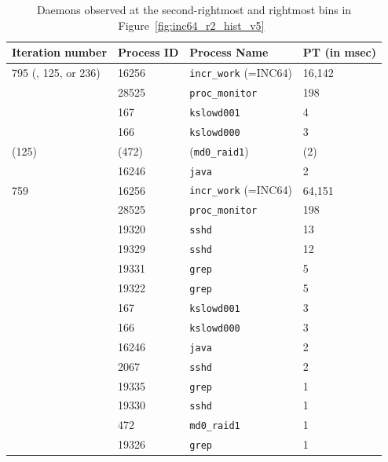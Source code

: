 \begin{table}[h]
\begin{center}
\begin{tabular}{|l|l|l|l|} \hline
Iteration number &  Process ID & Process Name  & PT (in msec)\\ \hline
795 (, 125, or 236) & 16256 & {\tt incr\_work} (=INC64) & 16,142 \\ \hline
	& 28525 & {\tt proc\_monitor} & 198 \\ \hline
	& 167 & {\tt kslowd001} &  4 \\ \hline
	& 166 & {\tt kslowd000} &  3 \\ \hline 
(125) & (472) & ({\tt md0\_raid1}) & (2) \\ \hline
    & 16246 & {\tt java} &  2 \\ \hline 
\hline 
759 & 16256 & {\tt incr\_work} (=INC64) & 64,151 \\ \hline
& 28525 & {\tt proc\_monitor} & 198 \\ \hline
& 19320 & {\tt sshd} & 13 \\ \hline
& 19329 & {\tt sshd}  & 12 \\ \hline
& 19331 & {\tt grep}  &  5 \\ \hline
& 19322 & {\tt grep}  &  5 \\ \hline
& 167 & {\tt kslowd001} & 3\\ \hline
& 166 & {\tt kslowd000} &  3 \\ \hline
& 16246 & {\tt java} &  2 \\ \hline
& 2067 & {\tt sshd}  &  2 \\ \hline
& 19335 & {\tt grep}  &  1 \\ \hline
& 19330 & {\tt sshd}  &  1 \\ \hline
& 472 & {\tt md0\_raid1} &  1 \\ \hline
& 19326 & {\tt grep}  &  1 \\ \hline
\hline
\end{tabular}
\end{center}
\caption{Daemons observed at the second-rightmost and rightmost bins in Figure~\ref{fig:inc64_r2_hist_v5}~\label{tab:inc64_daemons}}
\end{table}

\clearpage
\newpage
